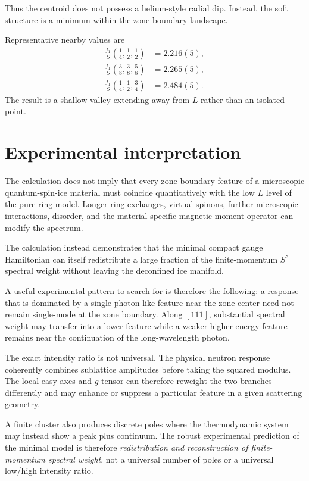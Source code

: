\documentclass[
aps,
prl,
onecolumn,
amsmath,
amssymb,
superscriptaddress,
longbibliography
]{revtex4-2}
\begin{document}
Thus the centroid does not possess a helium-style radial dip.
Instead, the soft structure is a minimum within the zone-boundary
landscape.

Representative nearby values are
\begin{align}
\frac{f_1}{S}
\left(
\frac14,\frac12,\frac12
\right)
&=
2.216(5),\\
\frac{f_1}{S}
\left(
\frac38,\frac38,\frac58
\right)
&=
2.265(5),\\
\frac{f_1}{S}
\left(
\frac14,\frac12,\frac34
\right)
&=
2.484(5).
\end{align}
The result is a shallow valley extending away from $L$ rather than an
isolated point.

\section{Experimental interpretation}
\label{sec:experiment}

The calculation does not imply that every zone-boundary feature of a
microscopic quantum-spin-ice material must coincide quantitatively
with the low $L$ level of the pure ring model.
Longer ring exchanges, virtual spinons, further microscopic
interactions, disorder, and the material-specific magnetic moment
operator can modify the spectrum.

The calculation instead demonstrates that the minimal compact gauge
Hamiltonian can itself redistribute a large fraction of the
finite-momentum $S^z$ spectral weight without leaving the deconfined
ice manifold.

A useful experimental pattern to search for is therefore the
following:
a response that is dominated by a single photon-like feature near the
zone center need not remain single-mode at the zone boundary.
Along $[111]$, substantial spectral weight may transfer into a lower
feature while a weaker higher-energy feature remains near the
continuation of the long-wavelength photon.

The exact intensity ratio is not universal.
The physical neutron response coherently combines sublattice
amplitudes before taking the squared modulus.
The local easy axes and $g$ tensor can therefore reweight the two
branches differently and may enhance or suppress a particular feature
in a given scattering geometry.

A finite cluster also produces discrete poles where the thermodynamic
system may instead show a peak plus continuum.
The robust experimental prediction of the minimal model is therefore
\emph{redistribution and reconstruction of finite-momentum spectral
weight}, not a universal number of poles or a universal low/high
intensity ratio.
\end{document}
